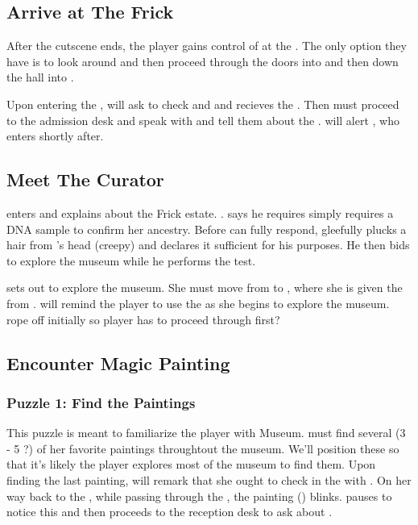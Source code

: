 \documentclass{article}
\begin{document}
\subsection{Arrive at The Frick}
After the cutscene ends, the player gains control of \cyl{} at the \rentrance{}. The only option they have is to look around and then proceed through the doors into \rentry{} and then down the hall into \rreception{}.

Upon entering the \rreception{}, \cbagchecker{} will ask \cyl{} to check \iylbag{} and \iylcoat{} and \cyl{} recieves the \ibagcheckstub{}. Then \cyl{} must proceed to the admission desk and speak with \cadmissions{} and tell them about the \ifrickestateletter{}. \cadmissions{} will alert \ccurator{}, who enters shortly after.
\subsection{Meet The Curator}
\ccurator{} enters and explains about the Frick estate. . \ccurator{} says he requires simply requires a DNA sample to confirm her ancestry. Before \cyl{} can fully respond, \ccurator{} gleefully plucks a hair from \cyl{}'s head (creepy) and declares it sufficient for his purposes. He then bids \cyl{} to explore the museum while he performs the test.

\cyl{} sets out to explore the museum. She must move from \rreception{} to \rentry{}, where she is given the \iaudioguide{} from \chelpdesk{}. \cyl{} will remind the player to use the \iaudioguide{} as she begins to explore the museum. rope off \rgardencourt{} initially so player has to proceed through \revest{} first?

\subsection{Encounter Magic Painting}












\subsubsection{Puzzle 1: Find the Paintings}
This puzzle is meant to familiarize the player with Museum. \cyl{} must find several (3 - 5 ?) of her favorite paintings throughtout the museum. We'll position these so that it's likely the player explores most of the museum to find them. Upon finding the last painting, \cyl{} will remark that she ought to check in the with \ccurator{}. On her way back to the \rreception{}, while passing through the \rdining{}, the painting (\prpjodrell{}) blinks. \cyl{} pauses to notice this and then proceeds to the reception desk to ask about \ccurator{}.
\end{document}
